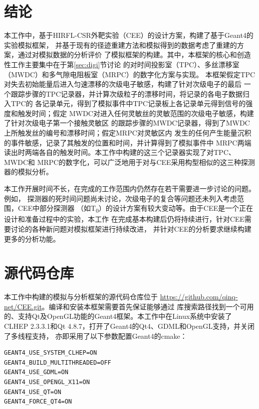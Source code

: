 \documentclass[bachelor,openany,oneside,color]{buaathesis}
\def\TZ{T\textsubscript{0}}
\begin{document}

\chapter*{结论}
本工作中，基于HIRFL-CSR外靶实验（CEE）的设计方案，构建了基于Geant4的实验模拟框架，
并基于现有的径迹重建方法和模拟得到的数据考虑了重建的方案，通过对模拟数据的分析评价
了模拟框架的构建。其中，本框架的核心和创造性工作主要集中在于第\ref{sec:digi}节讨论
的对时间投影室（TPC）、多丝漂移室（MWDC）和多气隙电阻板室（MRPC）的数字化方案与实现。
本框架假定TPC对失去初始能量后进入匀速漂移的次级电子敏感，构建了针对次级电子的最后
一个跟踪步骤的TPC记录器，并计算次级粒子的漂移时间，将记录的各电子数据归入TPC的
各记录单元，得到了模拟事件中TPC记录板上各记录单元得到信号的强度和触发时间；假定
MWDC对进入任何灵敏丝的灵敏范围的次级电子敏感，构建了针对次级电子第一个接触灵敏区
的跟踪步骤的MWDC记录器，得到了MWDC上所触发丝的编号和漂移时间；假定MRPC对灵敏区内
发生的任何产生能量沉积的事件敏感，记录了其触发的位置和时间，并计算得到了模拟事件中
MRPC两端读出时两端各自的触发时间。本工作中构建的这三个记录器实现了对TPC、MWDC和
MRPC的数字化，可以广泛地用于对与CEE采用构型相似的这三种探测器的模拟分析。

本工作开展时间不长，在完成的工作范围内仍然存在若干需要进一步讨论的问题。例如，
探测器的死时间问题尚未讨论，次级电子的复合等问题还未列入考虑范围，CEE中部分探测器
（如\TZ）的设计方案有较大变动等。由于CEE是一个正在设计和准备过程中的实验，本工作
在完成基本构建后仍将持续进行，针对CEE需要讨论的各种新问题对模拟框架进行持续改进，
并针对CEE的分析要求继续构建更多的分析功能。



%
\printbibliography[heading=bibintoc,title={参考文献}]

\appendix
\chapter{源代码仓库}\label{chap:repo}
本工作中构建的模拟与分析框架的源代码仓库位于
\url{https://github.com/qinq-net/CEE.git}。编译和安装本框架需要首先保证能够通过
库搜索路径找到一个可用的、支持Qt及OpenGL功能的Geant4框架。本工作中在Linux系统中安装了
CLHEP 2.3.3.1和Qt 4.8.7，打开了Geant4的Qt4、GDML和OpenGL支持，并关闭了多线程支持，
亦即采用了以下参数配置Geant4的cmake：

\begin{lstlisting}[caption={Geant4 编译选项}]
GEANT4_USE_SYSTEM_CLHEP=ON
GEANT4_BUILD_MULTITHREADED=OFF
GEANT4_USE_GDML=ON
GEANT4_USE_OPENGL_X11=ON
GEANT4_USE_QT=ON
GEANT4_FORCE_QT4=ON
\end{lstlisting}
\end{document}
